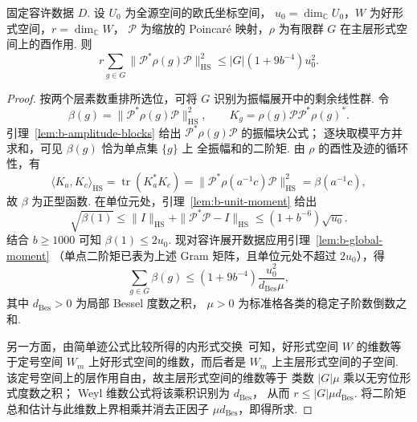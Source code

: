 \begin{lemma}
\label{lem:b-second-moment}
\emitthmsource
固定容许数据 $D$. 设 $U_0$ 为全源空间的欧氏坐标空间，
$u_0=\dim_{\mathbb C}U_0$，$W$ 为好形式空间，$r=\dim_{\mathbb C}W$，
$\mathcal P$ 为缩放的 Poincaré 映射，$\rho$ 为有限群
$G$ 在主层形式空间上的酉作用. 则
\begin{equation}
 r\sum_{g\in G}\|\mathcal P^*\rho(g)\mathcal P\|_{\mathrm{HS}}^2
 \le |G|(1+9b^{-4})u_0^2 .
\label{eq:b-second-moment}
\end{equation}
\end{lemma}
\begin{proof}
按两个层素数重排所选位，可将 $G$ 识别为振幅展开中的剩余线性群.
令
\[
 \beta(g)=\|\mathcal P^*\rho(g)\mathcal P\|_{\mathrm{HS}}^2,
 \qquad
 K_g=\rho(g)\mathcal P\mathcal P^*\rho(g)^* .
\]
引理~\ref{lem:b-amplitude-blocks}
给出 $\mathcal P^*\rho(g)\mathcal P$ 的振幅块公式；
逐块取模平方并求和，可见 $\beta(g)$ 恰为单点集 $\{g\}$ 上
全振幅和的二阶矩.
由 $\rho$ 的酉性及迹的循环性，有
\[
 \langle K_a,K_c\rangle_{\mathrm{HS}}
 =\operatorname{tr}(K_a^*K_c)
 =\|\mathcal P^*\rho(a^{-1}c)\mathcal P\|_{\mathrm{HS}}^2
 =\beta(a^{-1}c),
\]
故 $\beta$ 为正型函数. 在单位元处，引理~\ref{lem:b-unit-moment} 给出
\[
 \sqrt{\beta(1)}
 \le \|I\|_{\mathrm{HS}}+\|\mathcal P^*\mathcal P-I\|_{\mathrm{HS}}
 \le (1+b^{-6})\sqrt{u_0}.
\]
结合 $b\ge1000$ 可知 $\beta(1)\le 2u_0$. 现对容许展开数据应用引理~\ref{lem:b-global-moment}
（单点二阶矩已表为上述 Gram 矩阵，且单位元处不超过 $2u_0$），得
\[
 \sum_{g\in G}\beta(g)
 \le (1+9b^{-4})\frac{u_0^2}{d_{\mathrm{Bes}}\mu},
\]
其中 $d_{\mathrm{Bes}}>0$ 为局部 Bessel 度数之积，
$\mu>0$ 为标准格各类的稳定子阶数倒数之和.

另一方面，由简单迹公式比较所得的内形式交换~\cite{HarrisLabesse2004,Labesse2011}可知，好形式空间 $W$ 的维数等于定号空间
$W_m$ 上好形式空间的维数，而后者是 $W_m$ 上主层形式空间的子空间.
该定号空间上的层作用自由，故主层形式空间的维数等于
类数 $|G|\mu$ 乘以无穷位形式度数之积；
Weyl 维数公式将该乘积识别为 $d_{\mathrm{Bes}}$，
从而 $r\le |G|\mu d_{\mathrm{Bes}}$.
将二阶矩总和估计与此维数上界相乘并消去正因子 $\mu d_{\mathrm{Bes}}$，即得所求.
\end{proof}

